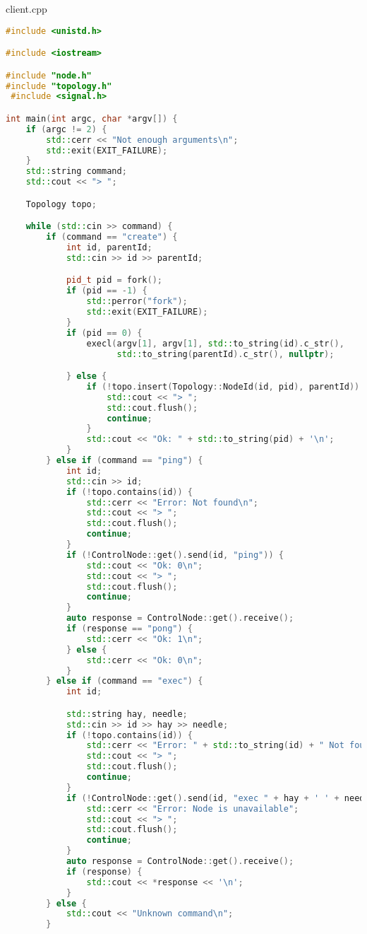 \documentclass[a4paper, 12pt]{article}
\begin{document}
client.cpp
\begin{lstlisting}[language=C++]
#include <unistd.h>

#include <iostream>

#include "node.h"
#include "topology.h"
 #include <signal.h>

int main(int argc, char *argv[]) {
    if (argc != 2) {
        std::cerr << "Not enough arguments\n";
        std::exit(EXIT_FAILURE);
    }
    std::string command;
    std::cout << "> ";

    Topology topo;

    while (std::cin >> command) {
        if (command == "create") {
            int id, parentId;
            std::cin >> id >> parentId;

            pid_t pid = fork();
            if (pid == -1) {
                std::perror("fork");
                std::exit(EXIT_FAILURE);
            }
            if (pid == 0) {
                execl(argv[1], argv[1], std::to_string(id).c_str(),
                      std::to_string(parentId).c_str(), nullptr);

            } else {
                if (!topo.insert(Topology::NodeId(id, pid), parentId)) {
                    std::cout << "> ";
                    std::cout.flush();
                    continue;
                }
                std::cout << "Ok: " + std::to_string(pid) + '\n';
            }
        } else if (command == "ping") {
            int id;
            std::cin >> id;
            if (!topo.contains(id)) {
                std::cerr << "Error: Not found\n";
                std::cout << "> ";
                std::cout.flush();
                continue;
            }
            if (!ControlNode::get().send(id, "ping")) {
                std::cout << "Ok: 0\n";
                std::cout << "> ";
                std::cout.flush();
                continue;
            }
            auto response = ControlNode::get().receive();
            if (response == "pong") {
                std::cerr << "Ok: 1\n";
            } else {
                std::cerr << "Ok: 0\n";
            }
        } else if (command == "exec") {
            int id;

            std::string hay, needle;
            std::cin >> id >> hay >> needle;
            if (!topo.contains(id)) {
                std::cerr << "Error: " + std::to_string(id) + " Not found\n";
                std::cout << "> ";
                std::cout.flush();
                continue;
            }
            if (!ControlNode::get().send(id, "exec " + hay + ' ' + needle)) {
                std::cerr << "Error: Node is unavailable";
                std::cout << "> ";
                std::cout.flush();
                continue;
            }
            auto response = ControlNode::get().receive();
            if (response) {
                std::cout << *response << '\n';
            }
        } else {
            std::cout << "Unknown command\n";
        }


\end{lstlisting}
\end{document}
